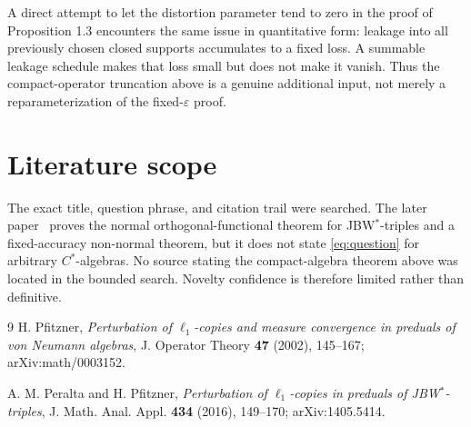 \documentclass[11pt]{article}
\begin{document}
A direct attempt to let the distortion parameter tend to zero in the proof
of Proposition 1.3 encounters the same issue in quantitative form: leakage
into all previously chosen closed supports accumulates to a fixed loss.  A
summable leakage schedule makes that loss small but does not make it vanish.
Thus the compact-operator truncation above is a genuine additional input,
not merely a reparameterization of the fixed-$\varepsilon$ proof.

\section{Literature scope}

The exact title, question phrase, and citation trail were searched.  The
later paper~\cite{PP16} proves the normal orthogonal-functional theorem for
JBW$^*$-triples and a fixed-accuracy non-normal theorem, but it does not state
\eqref{eq:question} for arbitrary $C^*$-algebras.  No source stating the
compact-algebra theorem above was located in the bounded search.  Novelty
confidence is therefore limited rather than definitive.

\begin{thebibliography}{9}
H. Pfitzner,
\emph{Perturbation of $\ell_1$-copies and measure convergence in preduals of
von Neumann algebras},
J. Operator Theory \textbf{47} (2002), 145--167;
arXiv:math/0003152.

A. M. Peralta and H. Pfitzner,
\emph{Perturbation of $\ell_1$-copies in preduals of JBW$^*$-triples},
J. Math. Anal. Appl. \textbf{434} (2016), 149--170;
arXiv:1405.5414.
\end{thebibliography}
\end{document}
